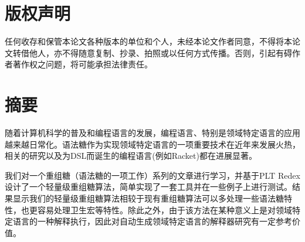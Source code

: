 \documentclass[UTF8,openany,AutoFakeBold,AutoFakeSlant,cs4size]{ctexbook}
\title{}
\author{}
\date{}
\newcommand{\upcite}[1]{\textsuperscript{\cite{#1}}} %
\begin{document}
\newcommand{\chineseTitle}{一种利用Redex实现重组糖的轻量级方法}
\newcommand{\englishTitle}{A lightweight resugaring method using PLT Redex}
\newcommand{\name}{杨子毅}
\newcommand{\studentID}{1600011063}
\newcommand{\school}{信息科学技术学院}
\newcommand{\major}{软件工程}
\newcommand{\advisor}{胡振江}

\clearpage



\clearpage

\songti\linespread{1.5}\selectfont
\linespread{1.5}\selectfont
\chapter*{版权声明}
\setcounter{page}{0}
\thispagestyle{empty}
任何收存和保管本论文各种版本的单位和个人，未经本论文作者同意，不得将本论文转借他人，亦不得随意复制、抄录、拍照或以任何方式传播。否则，引起有碍作者著作权之问题，将可能承担法律责任。
\clearpage

\quad
\setcounter{page}{0}
\thispagestyle{empty}
\clearpage



\pagestyle{fancy}
\normalsize
\linespread{1.5}\selectfont
\chapter*{摘要}
随着计算机科学的普及和编程语言的发展，编程语言、特别是领域特定语言的应用越来越日常化。语法糖作为实现领域特定语言的一项重要技术在近年来发展火热，相关的研究\upcite{PhysRev.47.777}以及为DSL而诞生的编程语言(例如Racket\upcite{PhysRev.47.777})都在进展显著。

我们对一个重组糖\upcite{PhysRev.47.777}（语法糖的一项工作）系列的文章进行学习，并基于PLT Redex设计了一个轻量级重组糖算法，简单实现了一套工具并在一些例子上进行测试。结果显示我们的轻量级重组糖算法相较于现有重组糖算法可以多处理一些语法糖特性，也更容易处理卫生宏等特性。除此之外，由于该方法在某种意义上是对领域特定语言的一种解释执行，因此对自动生成领域特定语言的解释器研究有一定参考价值。

\bigskip
{}



{
	\fancyhf{} %



	\fancyfoot[CO,CE]{~\thepage~}

	\renewcommand{\headrulewidth}{0.7pt} %

	\renewcommand{\footrulewidth}{0pt} %
}
\end{document}
